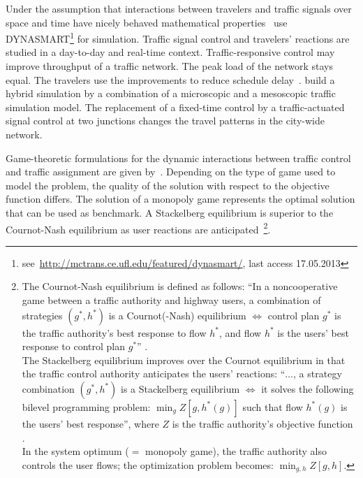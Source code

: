 Under the assumption that interactions between travelers and traffic signals over space and time have nicely behaved mathematical properties~\citet{Hu1997D2DFlowEvolutionReactiveSignalsDynasmart} use DYNASMART\footnote{see~\url{http://mctrans.ce.ufl.edu/featured/dynasmart/}, last access 17.05.2013} for simulation. 
Traffic signal control and travelers' reactions are studied in a day-to-day and real-time context. 
Traffic-responsive control may improve throughput of a traffic network. 
The peak load of the network stays equal. 
The travelers use the improvements to reduce schedule delay~\citep{Hu1997D2DFlowEvolutionReactiveSignalsDynasmart}. 
\citet{Burghout2007HybridSimulationAdaptiveSignal} build a hybrid simulation by a combination of a microscopic and a mesoscopic traffic simulation model. 
The replacement of a fixed-time control by a traffic-actuated signal control at two junctions changes the travel patterns in the city-wide network. 

Game-theoretic formulations for the dynamic interactions between traffic control and traffic assignment are given by~\citet{ChenBenAkiva1998GameDynamicTrafficControl}. 
Depending on the type of game used to model the problem, the quality of the solution with respect to the objective function differs.  
The solution of a monopoly game represents the optimal solution that can be used as benchmark. 
A Stackelberg equilibrium is superior to the Cournot-Nash equilibrium as user reactions are anticipated~\citep{ChenBenAkiva1998GameDynamicTrafficControl}\footnote{
%
The Cournot-Nash equilibrium is defined as follows: 
``In a noncooperative game between a traffic authority and highway
users, a combination of strategies $(g^*, h^*)$ is a Cournot(-Nash) equilibrium
$\Leftrightarrow$ control plan $g^*$ is the traffic authority's best
response to flow $h^*$, and flow $h^*$ is the users' 
best response to control plan $g^*$'' \citep[from][]{ChenBenAkiva1998GameDynamicTrafficControl}.
%
\\
%
The Stackelberg equilibrium improves over the Cournot equilibrium in
that the traffic control authority anticipates the users' reactions:
``$\ldots$, a strategy combination $(g^*,h^*)$ is a Stackelberg
equilibrium $\Leftrightarrow$ it solves the following bilevel
programming problem: $\min_g Z[g,h^*(g)]$ such that flow $h^*(g)$ is
the users' best response'', where $Z$ is the traffic authority's
objective function \citep[after][]{ChenBenAkiva1998GameDynamicTrafficControl}.
%
\\
%
In the system optimum ($=$ monopoly game), the traffic authority also
controls the user flows; the optimization problem becomes: $\min_{g,h}
Z[g,h]$.
%
}.

